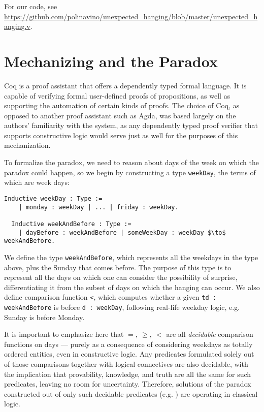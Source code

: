 \documentclass[runningheads]{llncs}
\begin{document}
  For our code, see \url{https://github.com/polinavino/unexpected_hanging/blob/master/unexpected_hanging.v}.

\section{Mechanizing and the Paradox}
\label{sec:form}

Coq is a proof assistant that offers a dependently typed formal language.
It is capable of verifying formal user-defined proofs of propositions, as well as supporting
the automation of certain kinds of proofs. The choice of Coq, as opposed to another
proof assistant such as Agda, was based largely on the authors' familiarity with the system,
as any dependently typed proof verifier that supports constructive logic
would serve just as well for the purposes of this mechanization.

To formalize the paradox, we need to reason about days of the week on which
the paradox could happen, so we
begin by constructing a type {\tt weekDay}, the terms of which are week days:

\begin{lstlisting}[mathescape=true]
  Inductive weekDay : Type :=
    | monday : weekDay | ... | friday : weekDay.

  Inductive weekAndBefore : Type :=
    | dayBefore : weekAndBefore | someWeekDay : weekDay $\to$ weekAndBefore.
\end{lstlisting}

We define the type {\tt weekAndBefore}, which represents all the weekdays in
the type above, plus the Sunday that comes before. The purpose of this type is to
represent all the days on which one can consider the possibility of surprise,
differentiating it from the subset of days on which the hanging can occur. We
also define comparison function {\tt <}, which computes
whether a given {\tt td : weekAndBefore} is before {\tt d : weekDay},
following real-life weekday logic, e.g. Sunday is before Monday.

It is important to emphasize here that $=,~\geq,~<$ are all \emph{decidable}
comparison functions on days --- purely as a consequence of considering weekdays
as totally ordered entities, even in constructive logic. Any predicates
formulated solely out of those comparisons together with logical connectives are also decidable,
with the implication that provability, knowledge, and truth are all the same for such predicates,
leaving no room for uncertainty.
Therefore, solutions of the paradox constructed out of only such decidable predicates (e.g. \cite{godelinconsistent})
are operating in classical logic.
\end{document}
